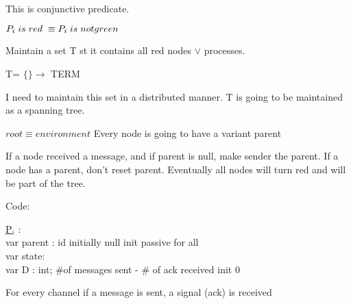 \documentclass[twoside]{article}
\begin{document}
This is conjunctive predicate. 

$P_i\hspace{1mm} is\hspace{1mm} red \hspace{1mm}\equiv P_i\hspace{1mm} is\hspace{1mm} not green $

Maintain a set T st it contains all red nodes $\lor$ processes.

T= $\{\} \rightarrow$ TERM

I need to maintain this set in a distributed manner. T is going to be maintained as a spanning tree.

$root $$\equiv$$ environment$\newline
Every node is going to have a variant parent

\begin{figure}[H]
\centering
{}
\end{figure}

If a node received a message, and if parent is null, make sender the parent.\newline
If a node has a parent, don't reset parent. Eventually all nodes will turn red and will be part of the tree.

Code:
\begin{tabbing}
\underline{P$_{i}$} :\= \\
\> var parent : id \hspace{16mm}initially null init passive for all\\
\> var state: \hspace{23mm}{active, passive} \\
\> var D : int; \hspace{20mm}\#of messages sent - \# of ack received init 0
\end{tabbing}    
For every channel if a message is sent, a signal (ack) is received
\end{document}
